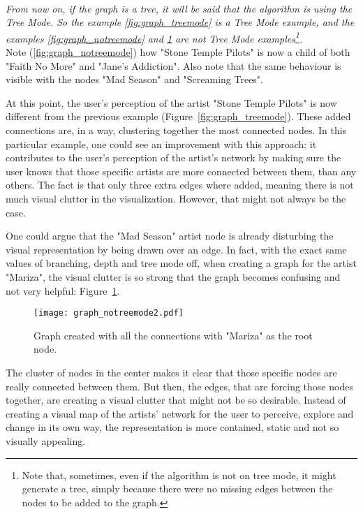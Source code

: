       \hfill \\
      \indent \emph{
      From now on, if the graph is a tree, it will be said that the algorithm is using the \emph{Tree Mode}.
      So the example \ref{fig:graph_treemode} is a \emph{Tree Mode} example, and the examples \ref{fig:graph_notreemode} and \ref{fig:graph_notreemode2} are not \emph{Tree Mode} examples\footnote{
        Note that, sometimes, even if the algorithm is not on tree mode, it might generate a tree, simply because there were no missing edges between the nodes to be added to the graph.
      }.}
      \hfill \\

      Note (\ref{fig:graph_notreemode}) how "Stone Temple Pilots" is now a child of both "Faith No More" and "Jane's Addiction".
      Also note that the same behaviour is visible with the nodes "Mad Season" and "Screaming Trees".

      At this point, the user's perception of the artist "Stone Temple Pilots" is now different from the previous example (Figure~\ref{fig:graph_treemode}).
      These added connections are, in a way, clustering together the most connected nodes.
      In this particular example, one could see an improvement with this approach: it contributes to the user's perception of the artist's network by making sure the user knows that those specific artists are more connected between them, than any others.
      The fact is that only three extra edges where added, meaning there is not much visual clutter in the visualization.
      However, that might not always be the case.

      One could argue that the "Mad Season" artist node is already disturbing the visual representation by being drawn over an edge.
      In fact, with the exact same values of branching, depth and tree mode off, when creating a graph for the artist "Mariza", the visual clutter is so strong that the graph becomes confusing and not very helpful: Figure~\ref{fig:graph_notreemode2}.

      \begin{figure}[tb]
        \begin{center}
          \texttt{[image: graph\_notreemode2.pdf]}
        \end{center}
        \caption{Graph created with all the connections with "Mariza" as the root node.}
        \label{fig:graph_notreemode2}
      \end{figure}

      The cluster of nodes in the center makes it clear that those specific nodes are really connected between them. 
      But then, the edges, that are forcing those nodes together, are creating a visual clutter that might not be so desirable.
      Instead of creating a visual map of the artists' network for the user to perceive, explore and change in its own way, the representation is more contained, static and not so visually appealing.
      \hfill \\

